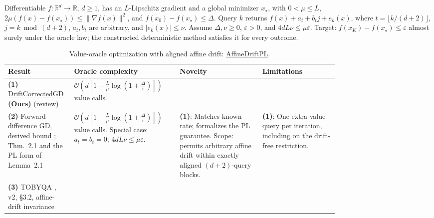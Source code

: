 \begin{table}[tp]
\centering
\caption{Value-oracle optimization with aligned affine drift: \href{https://github.com/k3nfalt/longtails/blob/main/LongTails/Setups/AffineDriftPL.lean}{AffineDriftPL}.}\label{tab:AffineDriftPL}
\parbox{\linewidth}{\footnotesize Differentiable $f:\mathbb{R}^d\to\mathbb{R}$, $d\ge1$, has an $L$-Lipschitz gradient and a global minimizer $x_\star$, with $0<\mu\le L$, $2\mu(f(x)-f(x_\star))\le\|\nabla f(x)\|^2$, and $f(x_0)-f(x_\star)\le\Delta$. Query $k$ returns $f(x)+a_t+b_tj+e_k(x)$, where $t=\lfloor k/(d+2)\rfloor$, $j=k\bmod(d+2)$, $a_t,b_t$ are arbitrary, and $|e_k(x)|\le\nu$. Assume $\Delta,\nu\ge0$, $\varepsilon>0$, and $4dL\nu\le\mu\varepsilon$. Target: $f(x_K)-f(x_\star)\le\varepsilon$ almost surely under the oracle law; the constructed deterministic method satisfies it for every outcome.}\par\smallskip
\begin{threeparttable}
\footnotesize
\setlength{\tabcolsep}{4pt}\renewcommand{\arraystretch}{1.25}
\begin{tabularx}{\linewidth}{@{}>{\raggedright\arraybackslash}p{0.20\linewidth}>{\raggedright\arraybackslash}p{0.32\linewidth}>{\raggedright\arraybackslash}p{0.25\linewidth}>{\raggedright\arraybackslash}X@{}}
\toprule
\textbf{Result} & \textbf{Oracle complexity} & \textbf{Novelty} & \textbf{Limitations} \\
\midrule
\textbf{(1)} \href{https://github.com/k3nfalt/longtails/blob/main/LongTails/Theorems/DriftCorrectedGD.lean}{Drift\allowbreak Corrected\allowbreak GD} \textbf{(Ours)} \href{https://github.com/k3nfalt/longtails/blob/main/scripts/reviews/DriftCorrectedGD.md}{(review)}
& $\mathcal{O}\!\left(d\left[1+\frac{L}{\mu}\log\left(1+\frac{\Delta}{\varepsilon}\right)\right]\right)$ value calls. & & \\
\midrule[1.2pt]
\textbf{(2)} Forward-difference GD, derived bound \citep{AffineDriftBerahas2022,AffineDriftFriedlander2012}; Thm.~2.1 and the PL form of Lemma~2.1
& $\mathcal{O}\!\left(d\left[1+\frac{L}{\mu}\log\left(1+\frac{\Delta}{\varepsilon}\right)\right]\right)$ value calls. Special case: $a_t=b_t=0$; $4dL\nu\le\mu\varepsilon$.
& \textbf{(1)}: Matches known rate; formalizes the PL guarantee. Scope: permits arbitrary affine drift within exactly aligned $(d+2)$-query blocks.
& \textbf{(1)}: One extra value query per iteration, including on the drift-free restriction. \\
\midrule
\textbf{(3)} TOBYQA \citep{AffineDriftYao2026}, v2, \S3.2, affine-drift invariance

\end{tabularx}
\end{threeparttable}
\end{table}
